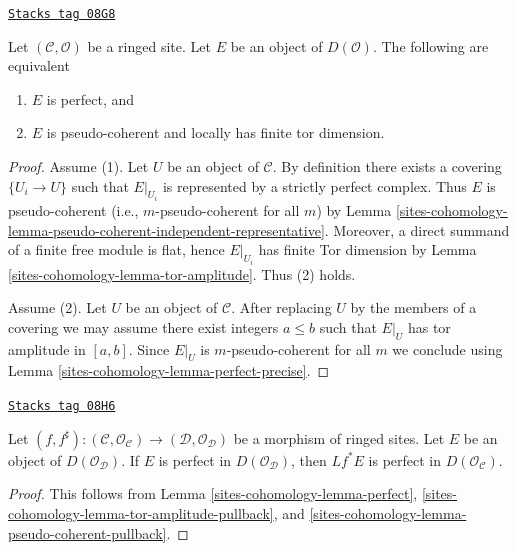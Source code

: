 \begin{lemma}[Perfect]
\label{sites-cohomology-lemma-perfect}
\href{https://stacks.math.columbia.edu/tag/08G8}{\texttt{Stacks tag 08G8}}

Let $(\mathcal{C}, \mathcal{O})$ be a ringed site.
Let $E$ be an object of $D(\mathcal{O})$.
The following are equivalent
\begin{enumerate}
\item $E$ is perfect, and
\item $E$ is pseudo-coherent and locally has finite tor dimension.
\end{enumerate}
\end{lemma}

\begin{proof}
Assume (1). Let $U$ be an object of $\mathcal{C}$.
By definition there exists a covering $\{U_i \to U\}$ such that
$E|_{U_i}$ is represented by a strictly perfect complex.
Thus $E$ is pseudo-coherent (i.e., $m$-pseudo-coherent for all $m$) by
Lemma \ref{sites-cohomology-lemma-pseudo-coherent-independent-representative}.
Moreover, a direct summand of a finite free module is flat, hence
$E|_{U_i}$ has finite Tor dimension by
Lemma \ref{sites-cohomology-lemma-tor-amplitude}. Thus (2) holds.

\medskip\noindent
Assume (2). Let $U$ be an object of $\mathcal{C}$.
After replacing $U$ by the members of a covering
we may assume there exist integers $a \leq b$ such that $E|_U$
has tor amplitude in $[a, b]$. Since $E|_U$ is $m$-pseudo-coherent
for all $m$ we conclude using Lemma \ref{sites-cohomology-lemma-perfect-precise}.
\end{proof}

\begin{lemma}
\label{sites-cohomology-lemma-perfect-pullback}
\href{https://stacks.math.columbia.edu/tag/08H6}{\texttt{Stacks tag 08H6}}

Let $(f, f^\sharp) : (\mathcal{C}, \mathcal{O}_\mathcal{C}) \to
(\mathcal{D}, \mathcal{O}_\mathcal{D})$
be a morphism of ringed sites.
Let $E$ be an object of $D(\mathcal{O}_\mathcal{D})$.
If $E$ is perfect in $D(\mathcal{O}_\mathcal{D})$,
then $Lf^*E$ is perfect in $D(\mathcal{O}_\mathcal{C})$.
\end{lemma}

\begin{proof}
This follows from Lemma \ref{sites-cohomology-lemma-perfect},
\ref{sites-cohomology-lemma-tor-amplitude-pullback}, and
\ref{sites-cohomology-lemma-pseudo-coherent-pullback}.
\end{proof}

